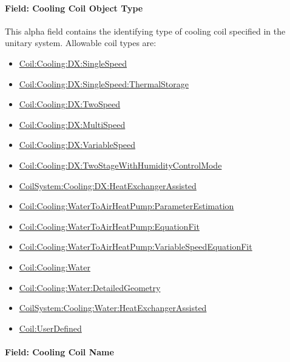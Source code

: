 \paragraph{Field: Cooling Coil Object Type}\label{field-cooling-coil-object-type-002}

This alpha field contains the identifying type of cooling coil specified in the unitary system. Allowable coil types are:

\begin{itemize}
\item
  \hyperref[coilcoolingdxsinglespeed]{Coil:Cooling:DX:SingleSpeed}
\item
  \hyperref[coilcoolingdxsinglespeedthermalstorage]{Coil:Cooling:DX:SingleSpeed:ThermalStorage}
\item
  \hyperref[coilcoolingdxtwospeed]{Coil:Cooling:DX:TwoSpeed}
\item
  \hyperref[coilcoolingdxmultispeed]{Coil:Cooling:DX:MultiSpeed}
\item
  \hyperref[coilcoolingdxvariablespeed]{Coil:Cooling:DX:VariableSpeed}
\item
  \hyperref[coilcoolingdxtwostagewithhumiditycontrolmode]{Coil:Cooling:DX:TwoStageWithHumidityControlMode}
\item
  \hyperref[coilsystemcoolingdxheatexchangerassisted]{CoilSystem:Cooling:DX:HeatExchangerAssisted}
\item
  \hyperref[coilcoolingwatertoairheatpumpparameterestimation]{Coil:Cooling:WaterToAirHeatPump:ParameterEstimation}
\item
  \hyperref[coilcoolingwatertoairheatpumpequationfit]{Coil:Cooling:WaterToAirHeatPump:EquationFit}
\item
  \hyperref[coilcoolingwatertoairheatpumpvariablespeedequationfit]{Coil:Cooling:WaterToAirHeat\hyperref[pumpvariablespeed]{Pump:VariableSpeed}EquationFit}
\item
  \hyperref[coilcoolingwater]{Coil:Cooling:Water}
\item
  \hyperref[coilcoolingwaterdetailedgeometry]{Coil:Cooling:Water:DetailedGeometry}
\item
  \hyperref[coilsystemcoolingwaterheatexchangerassisted]{CoilSystem:Cooling:Water:HeatExchangerAssisted}
\item
  \hyperref[coiluserdefined]{Coil:UserDefined}
\end{itemize}

\paragraph{Field: Cooling Coil Name}\label{field-cooling-coil-name-002}

